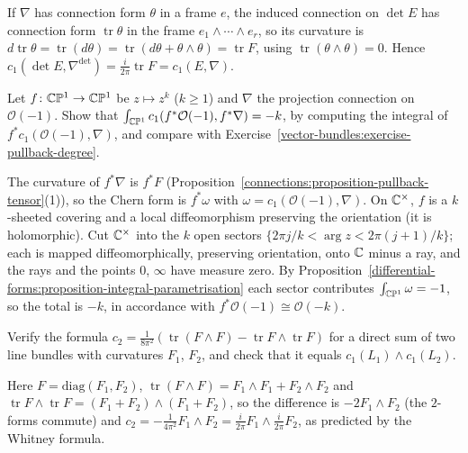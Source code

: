 \begin{solution}
If $\nabla$ has connection form $\theta$ in a frame $e$, the induced connection on $\det E$ has connection form $\operatorname{tr}\theta$ in the frame $e_1 \wedge \cdots \wedge e_r$, so its curvature is
$d\operatorname{tr}\theta = \operatorname{tr}(d\theta) = \operatorname{tr}(d\theta + \theta \wedge \theta) = \operatorname{tr}F$, using $\operatorname{tr}(\theta \wedge \theta) = 0$. Hence
$c_1(\det E, \nabla^{\det}) = \frac{i}{2\pi}\operatorname{tr}F = c_1(E, \nabla)$.
\end{solution}

\begin{exercise}\label{characteristic-classes:exercise-pullback-curvature}
Let $f \colon \mathbb{C}\mathbb{P}^1 \to \mathbb{C}\mathbb{P}^1$ be $z \mapsto z^k$ ($k \geq 1$) and $\nabla$ the projection connection on $\mathcal{O}(-1)$. Show that $\int_{\mathbb{C}\mathbb{P}^1}c_1(f^*\mathcal{O}(-1), f^*\nabla) = -k$,
by computing the integral of $f^*c_1(\mathcal{O}(-1), \nabla)$, and compare with Exercise~\ref{vector-bundles:exercise-pullback-degree}.
\end{exercise}

\begin{solution}
The curvature of $f^*\nabla$ is $f^*F$ (Proposition~\ref{connections:proposition-pullback-tensor}(1)), so the Chern form is $f^*\omega$ with $\omega = c_1(\mathcal{O}(-1), \nabla)$. On
$\mathbb{C}^\times$, $f$ is a $k$-sheeted covering and a local diffeomorphism preserving the orientation (it is holomorphic). Cut $\mathbb{C}^\times$ into the $k$ open sectors
$\{2\pi j/k < \arg z < 2\pi(j + 1)/k\}$; each is mapped diffeomorphically, preserving orientation, onto $\mathbb{C}$ minus a ray, and the rays and the points $0$, $\infty$ have measure zero. By
Proposition~\ref{differential-forms:proposition-integral-parametrisation} each sector contributes $\int_{\mathbb{C}\mathbb{P}^1}\omega = -1$, so the total is $-k$, in accordance with
$f^*\mathcal{O}(-1) \cong \mathcal{O}(-k)$.
\end{solution}

\begin{exercise}\label{characteristic-classes:exercise-c2-formula}
Verify the formula $c_2 = \frac{1}{8\pi^2}(\operatorname{tr}(F \wedge F) - \operatorname{tr}F \wedge \operatorname{tr}F)$ for a direct sum of two line bundles with curvatures $F_1$, $F_2$, and check that it
equals $c_1(L_1) \wedge c_1(L_2)$.
\end{exercise}

\begin{solution}
Here $F = \mathrm{diag}(F_1, F_2)$, $\operatorname{tr}(F \wedge F) = F_1 \wedge F_1 + F_2 \wedge F_2$ and $\operatorname{tr}F \wedge \operatorname{tr}F = (F_1 + F_2) \wedge (F_1 + F_2)$, so the difference is
$-2F_1 \wedge F_2$ (the $2$-forms commute) and $c_2 = -\frac{1}{4\pi^2}F_1 \wedge F_2 = \frac{i}{2\pi}F_1 \wedge \frac{i}{2\pi}F_2$, as predicted by the Whitney formula.
\end{solution}

